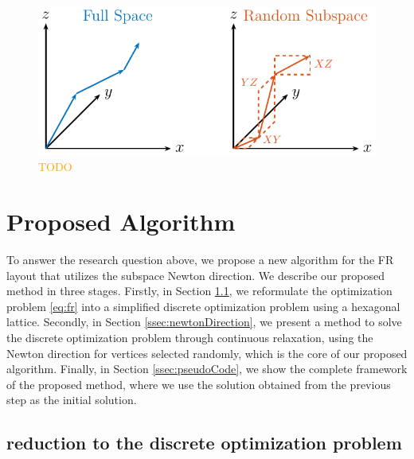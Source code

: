 \documentclass[dvipdfmx,journal]{IEEEtran}
\newcommand{\orange}[1]{\textcolor{orange}{#1}}
\begin{document}
\begin{figure}[t]
    \centering
    \includegraphics[width=\columnwidth]{subspace/subspace.pdf}
    \caption{\orange{TODO}}
    \label{fig:subspace}
\end{figure}

\section{Proposed Algorithm}\label{sec:algorithm}

To answer the research question above, we propose a new algorithm for the FR layout that utilizes the subspace Newton direction.
We describe our proposed method in three stages.
Firstly, in Section \ref{ssec:reduction}, we reformulate the optimization problem \eqref{eq:fr} into a simplified discrete optimization problem using a hexagonal lattice.
Secondly, in Section \ref{ssec:newtonDirection}, we present a method to solve the discrete optimization problem through continuous relaxation, using the Newton direction for vertices selected randomly, which is the core of our proposed algorithm.
Finally, in Section \ref{ssec:pseudoCode}, we show the complete framework of the proposed method, where we use the solution obtained from the previous step as the initial solution.

\subsection{reduction to the discrete optimization problem}\label{ssec:reduction}
\end{document}
